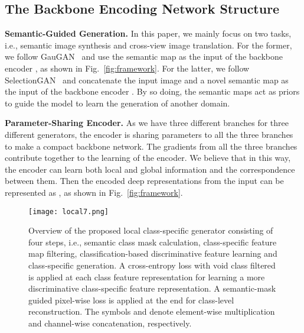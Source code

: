 \documentclass[10pt,twocolumn,letterpaper]{article}
\begin{document}
\subsection{The Backbone Encoding Network Structure}
\noindent \textbf{Semantic-Guided Generation.}
In this paper, we mainly focus on two tasks, i.e., semantic image synthesis and cross-view image translation.
For the former, we follow GauGAN~\cite{park2019semantic} and use the semantic map  as the input of the backbone encoder , as shown in Fig.~\ref{fig:framework}.
For the latter, we follow SelectionGAN~\cite{tang2019multi} and concatenate the input image  and a novel semantic map  as the input of the backbone encoder .
By so doing, the semantic maps act as priors to guide the model to learn the generation of another domain.


\noindent \textbf{Parameter-Sharing Encoder.}
As we have three different branches for three different generators, the encoder  is sharing parameters to all the three branches to make a compact backbone network. 
The gradients from all the three branches contribute together to the learning of the encoder. 
We believe that in this way, the encoder can learn both local and global information and the correspondence between them.
Then the encoded deep representations from the input  can be represented as , as shown in Fig.~\ref{fig:framework}.

\begin{figure*}[!t]
	\centering
	\texttt{[image: local7.png]}
	\caption{Overview of the proposed local class-specific generator  consisting of four steps, i.e., semantic class mask calculation, class-specific feature map filtering, classification-based discriminative feature learning and class-specific generation. A cross-entropy loss with void class filtered is applied at each class feature representation for learning a more discriminative class-specific feature representation. A semantic-mask guided pixel-wise  loss is applied at the end for class-level reconstruction. 	The symbols  and  denote  element-wise multiplication and channel-wise concatenation, respectively.
	}
	\label{fig:local}
	\vspace{-0.4cm}
\end{figure*}
\end{document}
